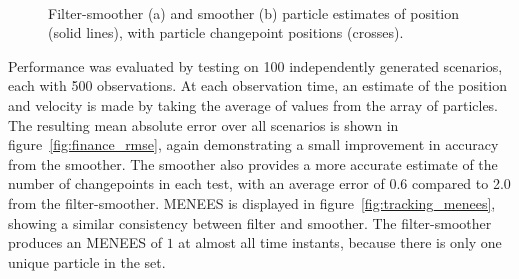 \documentclass[10pt,twocolumn,twoside]{IEEEtran}
\begin{document}
\begin{figure}[!t]
\centering
{} \\
\caption{Filter-smoother (a) and smoother (b) particle estimates of position (solid lines), with particle changepoint positions (crosses). }
\label{fig:2D_particle_results}
\end{figure}
%
Performance was evaluated by testing on 100 independently generated scenarios, each with 500 observations. At each observation time, an estimate of the position and velocity is made by taking the average of values from the array of particles. The resulting mean absolute error over all scenarios is shown in figure~\ref{fig:finance_rmse}, again demonstrating a small improvement in accuracy from the smoother. The smoother also provides a more accurate estimate of the number of changepoints in each test, with an average error of 0.6 compared to 2.0 from the filter-smoother. MENEES is displayed in figure~\ref{fig:tracking_menees}, showing a similar consistency between filter and smoother. The filter-smoother produces an MENEES of $1$ at almost all time instants, because there is only one unique particle in the set. %
\end{document}
